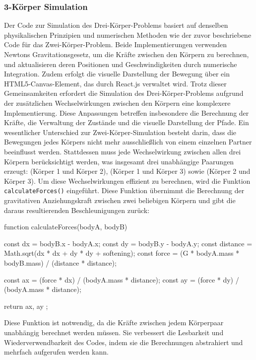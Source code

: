 \documentclass[a4paper,12pt,twoside]{article}
\begin{document}
\subsubsection{3-Körper Simulation}
Der Code zur Simulation des Drei-Körper-Problems basiert auf denselben physikalischen Prinzipien und numerischen Methoden wie der zuvor beschriebene Code für das Zwei-Körper-Problem. Beide Implementierungen verwenden Newtons Gravitationsgesetz, um die Kräfte zwischen den Körpern zu berechnen, und aktualisieren deren Positionen und Geschwindigkeiten durch numerische Integration. Zudem erfolgt die visuelle Darstellung der Bewegung über ein HTML5-Canvas-Element, das durch React.js verwaltet wird. Trotz dieser Gemeinsamkeiten erfordert die Simulation des Drei-Körper-Problems aufgrund der zusätzlichen Wechselwirkungen zwischen den Körpern eine komplexere Implementierung. Diese Anpassungen betreffen insbesondere die Berechnung der Kräfte, die Verwaltung der Zustände und die visuelle Darstellung der Pfade.
Ein wesentlicher Unterschied zur Zwei-Körper-Simulation besteht darin, dass die Bewegungen jedes Körpers nicht mehr ausschließlich von einem einzelnen Partner beeinflusst werden. Stattdessen muss jede Wechselwirkung zwischen allen drei Körpern berücksichtigt werden, was insgesamt drei unabhängige Paarungen erzeugt: (Körper 1 und Körper 2), (Körper 1 und Körper 3) sowie (Körper 2 und Körper 3). Um diese Wechselwirkungen effizient zu berechnen, wird die Funktion \texttt{calculateForces()} eingeführt. Diese Funktion übernimmt die Berechnung der gravitativen Anziehungskraft zwischen zwei beliebigen Körpern und gibt die daraus resultierenden Beschleunigungen zurück:

\begin{javascript}
function calculateForces(bodyA, bodyB) {
    const dx = bodyB.x - bodyA.x;
    const dy = bodyB.y - bodyA.y;
    const distance = Math.sqrt(dx * dx + dy * dy + softening);
    const force = (G * bodyA.mass * bodyB.mass) / (distance * distance);

    const ax = (force * dx) / (bodyA.mass * distance);
    const ay = (force * dy) / (bodyA.mass * distance);

    return { ax, ay };
}
\end{javascript}

Diese Funktion ist notwendig, da die Kräfte zwischen jedem Körperpaar unabhängig berechnet werden müssen. Sie verbessert die Lesbarkeit und Wiederverwendbarkeit des Codes, indem sie die Berechnungen abstrahiert und mehrfach aufgerufen werden kann.
\end{document}
